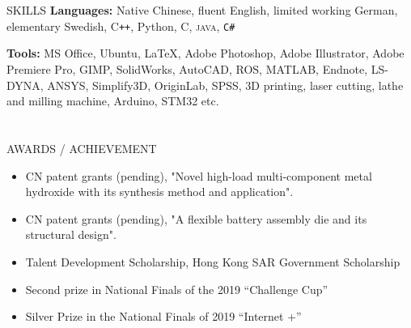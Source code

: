\documentclass{my_cv}
\begin{document}
\begin{multicols}{2}


\section{\faList}{SKILLS}
\textbf{Languages:} Native Chinese, fluent English, limited working German, elementary Swedish, C\texttt{++}, Python, C, \textsc{java}, \texttt{C\#}

\noindent\textbf{Tools:} MS Office, Ubuntu, \LaTeX, Adobe Photoshop, Adobe Illustrator, Adobe Premiere Pro, GIMP, SolidWorks, AutoCAD, ROS, MATLAB, Endnote, LS-DYNA, ANSYS, Simplify3D, OriginLab, SPSS, 3D printing, laser cutting, lathe and milling machine, Arduino, STM32 etc.

\section{\faStar}{AWARDS / ACHIEVEMENT}
\begin{itemize}[noitemsep]
    \item CN patent grants (pending), "Novel high-load multi-component metal hydroxide with its synthesis method and application".
    \item CN patent grants (pending), "A flexible battery assembly die and its structural design".
    \item Talent Development Scholarship, Hong Kong SAR Government Scholarship
    \item Second prize in National Finals of the 2019 “Challenge Cup” 
    \item Silver Prize in the National Finals of 2019 “Internet +”
\end{itemize}


\end{multicols}
\end{document}
